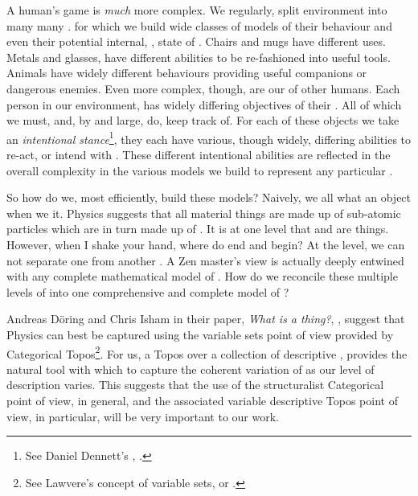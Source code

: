 A human's game is \emph{much} more complex. We regularly, split 
 environment into many many .  for 
which we build wide classes of models of their behaviour and even their 
potential internal, , state of . Chairs and 
mugs have different uses. Metals and glasses, have different abilities to 
be re-fashioned into useful tools. Animals have widely different 
behaviours providing useful companions or dangerous enemies. Even more 
complex, though, are our  of other humans. Each person in 
our environment, has widely differing objectives of their . All 
of which we must, and, by and large, do, keep track of. For each of these 
objects we take an \emph{intentional stance}\footnote{See Daniel Dennett's 
, \cite{dennett1987a}.}, they each have 
various, though widely, differing abilities to re-act, or intend with 
. These different intentional abilities are reflected in the 
overall complexity in the various models we build to represent any 
particular . 

So how do we, most efficiently, build these models? Naively, we all 
 what an object  when we  it. Physics 
suggests that all material things are made up of sub-atomic particles 
which are in turn made up of . It is  at one 
level that  and  are  things. 
However, when I shake your hand, where do   end 
and   begin? At the  level, we 
can not separate one  from another . A Zen 
master's view is actually deeply entwined with any complete mathematical 
model of . How do we reconcile these multiple levels of 
 into one comprehensive and complete model of 
? 

Andreas D\"oring and Chris Isham in their paper, \emph{What is a thing?}, 
\cite{doeringIsham2008thingTheoryFoundationsPhysics}, suggest that Physics 
can best be captured using the variable sets point of view provided by 
Categorical Topos\footnote{See Lawvere's concept of variable sets, 
\cite{lawvere1975continuouslyVariableSets} or 
\cite{lawvereRosebrugh2003setsForMathematics}.}. For us, a Topos over a 
collection of descriptive , provides the natural tool with 
which to capture the coherent variation of  as our level 
of description varies. This suggests that the use of the structuralist 
Categorical point of view, in general, and the associated variable 
descriptive Topos point of view, in particular, will be very important to 
our work. 

